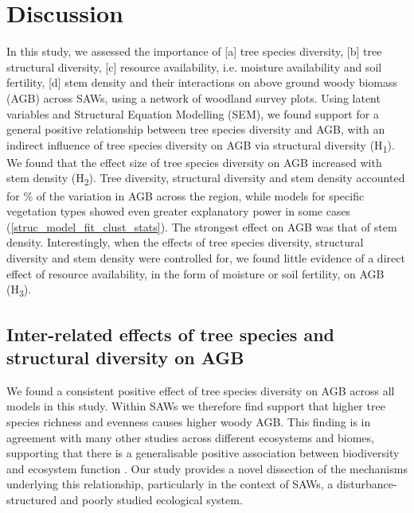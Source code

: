 \documentclass[11pt,a4paper]{article}
\begin{document}
\section{Discussion}


In this study, we assessed the importance of [a] tree species diversity, [b] tree structural diversity, [c] resource availability, i.e. moisture availability and soil fertility, [d] stem density and their interactions on above ground woody biomass (AGB) across SAWs, using a network of \nplots{} woodland survey plots. Using latent variables and Structural Equation Modelling (SEM), we found support for a general positive relationship between tree species diversity and AGB, with an indirect influence of tree species diversity on AGB via structural diversity (H\textsubscript{1}). We found that the effect size of tree species diversity on AGB increased with stem density (H\textsubscript{2}).  Tree diversity, structural diversity and stem density accounted for \srsq{}\% of the variation in AGB across the region, while models for specific vegetation types showed even greater explanatory power in some cases (\autoref{struc_model_fit_clust_stats}). The strongest effect on AGB was that of stem density. Interestingly, when the effects of tree species diversity, structural diversity and stem density were controlled for, we found little evidence of a direct effect of resource availability, in the form of moisture or soil fertility, on AGB (H\textsubscript{3}). 

\subsection{Inter-related effects of tree species and structural diversity on AGB}

We found a consistent positive effect of tree species diversity on AGB across all models in this study. Within SAWs we therefore find support that higher tree species richness and evenness causes higher woody AGB. This finding is in agreement with many other studies across different ecosystems and biomes, supporting that there is a generalisable positive association between biodiversity and ecosystem function \citep{Liang2016, Cardinale2009}. Our study provides a novel dissection of the mechanisms underlying this relationship, particularly in the context of SAWs, a disturbance-structured and poorly studied ecological system.
\end{document}
